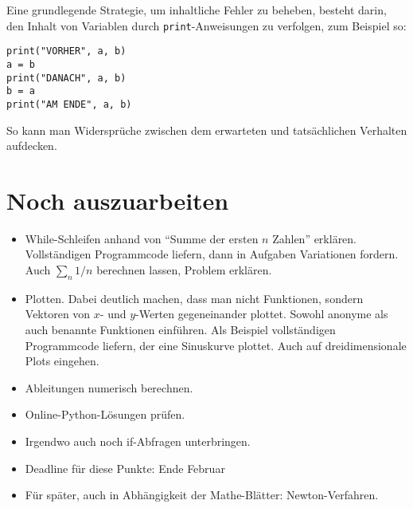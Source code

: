 \documentclass{blatt}
\begin{document}
Eine grundlegende Strategie, um inhaltliche Fehler zu beheben, besteht darin,
den Inhalt von Variablen durch \texttt{print}-Anweisungen zu
verfolgen, zum Beispiel so:
\begin{verbatim}
print("VORHER", a, b)
a = b
print("DANACH", a, b)
b = a
print("AM ENDE", a, b)
\end{verbatim}
So kann man Widersprüche zwischen dem erwarteten und tatsächlichen Verhalten
aufdecken.


\section{Noch auszuarbeiten}

\begin{itemize}
\item While-Schleifen anhand von "`Summe der ersten $n$ Zahlen"' erklären.
Vollständigen Programmcode liefern, dann in Aufgaben Variationen fordern.
Auch $\sum_n 1/n$ berechnen lassen, Problem erklären.
\item Plotten. Dabei deutlich machen, dass man nicht Funktionen, sondern
Vektoren von $x$- und $y$-Werten gegeneinander plottet. Sowohl anonyme als auch
benannte Funktionen einführen. Als Beispiel vollständigen Programmcode liefern,
der eine Sinuskurve plottet. Auch auf dreidimensionale Plots eingehen.
\item Ableitungen numerisch berechnen.
\item Online-Python-Lösungen prüfen.
\item Irgendwo auch noch if-Abfragen unterbringen.
\item Deadline für diese Punkte: Ende Februar
\item Für später, auch in Abhängigkeit der Mathe-Blätter: Newton-Verfahren.
\end{itemize}
\end{document}
